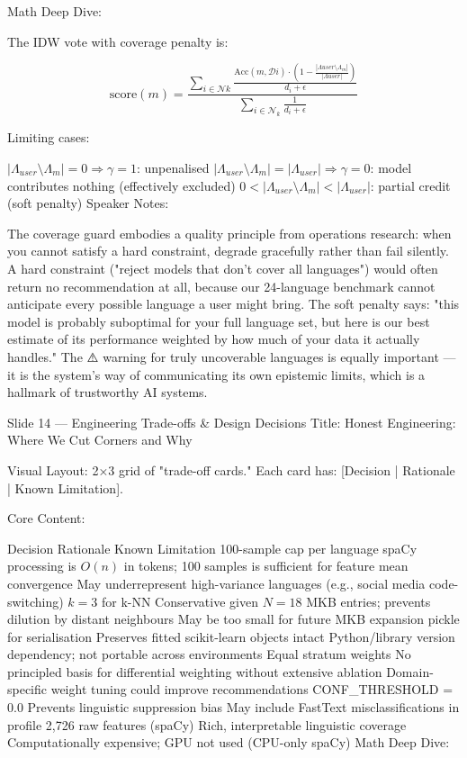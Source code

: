 Math Deep Dive:

The IDW vote with coverage penalty is:

$$\text{score}(m) = \frac{\displaystyle\sum_{i \in \mathcal{N}k} \frac{\text{Acc}(m, \mathcal{D}i) \cdot \left(1 - \frac{|\Lambda{user} \setminus \Lambda_m|}{|\Lambda{user}|}\right)}{d_i + \epsilon}}{\displaystyle\sum_{i \in \mathcal{N}_k} \frac{1}{d_i + \epsilon}}$$

Limiting cases:

$|\Lambda_{user} \setminus \Lambda_m| = 0 \Rightarrow \gamma = 1$: unpenalised
$|\Lambda_{user} \setminus \Lambda_m| = |\Lambda_{user}| \Rightarrow \gamma = 0$: model contributes nothing (effectively excluded)
$0 < |\Lambda_{user} \setminus \Lambda_m| < |\Lambda_{user}|$: partial credit (soft penalty)
Speaker Notes:

The coverage guard embodies a quality principle from operations research: when you cannot satisfy a hard constraint, degrade gracefully rather than fail silently. A hard constraint ("reject models that don't cover all languages") would often return no recommendation at all, because our 24-language benchmark cannot anticipate every possible language a user might bring. The soft penalty says: "this model is probably suboptimal for your full language set, but here is our best estimate of its performance weighted by how much of your data it actually handles." The ⚠️ warning for truly uncoverable languages is equally important — it is the system's way of communicating its own epistemic limits, which is a hallmark of trustworthy AI systems.

Slide 14 — Engineering Trade-offs & Design Decisions
Title: Honest Engineering: Where We Cut Corners and Why

Visual Layout: 2×3 grid of "trade-off cards." Each card has: [Decision | Rationale | Known Limitation].

Core Content:

Decision	Rationale	Known Limitation
100-sample cap per language	spaCy processing is $O(n)$ in tokens; 100 samples is sufficient for feature mean convergence	May underrepresent high-variance languages (e.g., social media code-switching)
$k=3$ for k-NN	Conservative given $N=18$ MKB entries; prevents dilution by distant neighbours	May be too small for future MKB expansion
pickle for serialisation	Preserves fitted scikit-learn objects intact	Python/library version dependency; not portable across environments
Equal stratum weights	No principled basis for differential weighting without extensive ablation	Domain-specific weight tuning could improve recommendations
CONF_THRESHOLD = 0.0	Prevents linguistic suppression bias	May include FastText misclassifications in profile
2,726 raw features (spaCy)	Rich, interpretable linguistic coverage	Computationally expensive; GPU not used (CPU-only spaCy)
Math Deep Dive:

